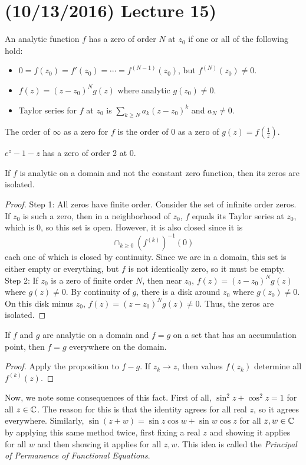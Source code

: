 \documentclass[11pt,leqno,oneside]{amsart}
\begin{document}
  \section{(10/13/2016) Lecture 15)}
  \begin{defn}
    An analytic function $f$ has a zero of order $N$ at $z_0$ if one
    or all of the following hold:
    \begin{itemize}
    \item $0 = f(z_0) = f'(z_0) = \cdots = f^{(N-1)}(z_0)$, but
      $f^{(N)}(z_0) \neq 0$.
    \item $f(z) = (z-z_0)^N g(z)$ where analytic $g(z_0) \neq 0$.
    \item Taylor series for $f$ at $z_0$ is $\sum_{k \geq N}
      a_k(z-z_0)^k$ and $a_N \neq 0$.
    \end{itemize}
    The order of $\infty$ as a zero for $f$ is the order of 0 as a  zero
    of $g(z) = f(\frac{1}{z})$. 
  \end{defn}
  \begin{example}
    $e^z-1-z$ has a zero of order 2 at 0.
  \end{example}
  \begin{prop}
    If $f$ is analytic on a domain and not the constant zero function,
    then its zeros are isolated.
  \end{prop}
  \begin{proof}
    Step 1: All zeros have finite order. Consider the set of infinite
    order zeros. If $z_0$ is such a zero, then in a neighborhood of
    $z_0$, $f$ equals its Taylor series at $z_0$, which is 0, so this
    set is open. However, it is also closed since it is \[
      \cap_{k \geq 0} (f^{(k)})^{-1}(0)
    \]
    each one of which is closed by continuity. Since we are in a
    domain, this set is either empty or everything, but $f$ is not
    identically zero, so it must be empty.\\
    Step 2: If $z_0$ is a zero of finite order $N$, then near $z_0$,
    $f(z) = (z-z_0)^N g(z)$ where $g(z) \neq 0$. By continuity of $g$,
    there is a disk around $z_0$ where $g(z_0) \neq 0$. On this disk
    minus $z_0$, $f(z) = (z-z_0)^N g(z) \neq 0$. Thus, the zeros are
    isolated. 
  \end{proof}
  \begin{cor}
    If $f$ and $g$ are analytic on a domain and $f=g$ on a set that
    has an accumulation point, then $f=g$ everywhere on the domain.
  \end{cor}
  \begin{proof}
    Apply the proposition to $f-g$. If $z_k \to z$, then values
    $f(z_k)$ determine all $f^{(k)}(z)$. 
  \end{proof}
  Now, we note some consequences of this fact. First of all, $\sin^2 z
  + \cos^2 z = 1$ for all $z \in {\mathbb C}$. The reason for this is that the
  identity agrees for all real $z$, so it agrees
  everywhere. Similarly, $\sin(z+w) = \sin z \cos w + \sin w \cos z$
  for all $z,w \in {\mathbb C}$ by applying this same method twice, first
  fixing a real $z$ and showing it applies for all $w$ and then
  showing it applies for all $z,w$. This idea is called the
  \emph{Principal of Permanence of Functional Equations}.
\end{document}
